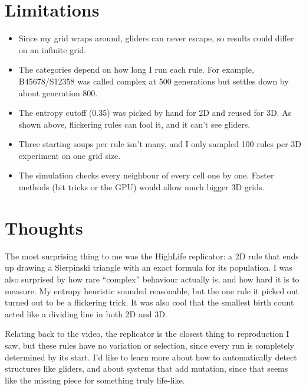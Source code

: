 \documentclass{article}
\begin{document}
\section{Limitations}
\begin{itemize}
    \item Since my grid wraps around, gliders can never escape, so results could differ on an infinite grid.
    \item The categories depend on how long I run each rule. For example, B45678/S12358 was called complex at 500 generations but settles down by about generation 800.
    \item The entropy cutoff (0.35) was picked by hand for 2D and reused for 3D. As shown above, flickering rules can fool it, and it can't see gliders.
    \item Three starting soups per rule isn't many, and I only sampled 100 rules per 3D experiment on one grid size.
    \item The simulation checks every neighbour of every cell one by one. Faster methods (bit tricks or the GPU) would allow much bigger 3D grids.
\end{itemize}

\section{Thoughts}
The most surprising thing to me was the HighLife replicator: a 2D rule that ends up drawing a Sierpinski triangle with an exact formula for its population. I was also surprised by how rare ``complex'' behaviour actually is, and how hard it is to measure. My entropy heuristic sounded reasonable, but the one rule it picked out turned out to be a flickering trick. It was also cool that the smallest birth count acted like a dividing line in both 2D and 3D.

Relating back to the video, the replicator is the closest thing to reproduction I saw, but these rules have no variation or selection, since every run is completely determined by its start. I'd like to learn more about how to automatically detect structures like gliders, and about systems that add mutation, since that seems like the missing piece for something truly life-like.
\end{document}

